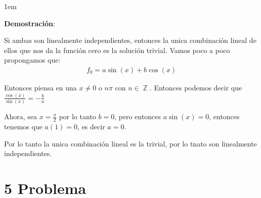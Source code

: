 \documentclass[12pt, fleqn]{article}                             %
\newenvironment{SmallIndentation}[1][0.75em]                    %
        {\begin{adjustwidth}{#1}{}\begin{footnotesize}}             %
        {\end{footnotesize}\end{adjustwidth}}                       %
\theoremstyle{break}                                            %
\DeclareMathOperator \Integers     {\mathbb{Z}}                 %
\newcommand{\Wrap}[1]    {\left( #1 \right)}                    %
\newcommand{\Cos}[1] {\cos\Wrap{#1}}                            %
\newcommand{\Sin}[1] {\sin\Wrap{#1}}                            %
\begin{document}
    \begin{SmallIndentation}[1em]
        \textbf{Demostración}:
        
        Si ambas son linealmente independientes, entonces la unica combinación lineal
        de ellos que nos da la función cero es la solución trivial. Vamos poco a poco
        propongamos que:
        \begin{align*}
            f_0 = a \Sin{x} + b \Cos{x}
        \end{align*}

        Entonces piensa en una $x \neq 0$ o $n\pi$ con $n \in \Integers$.
        Entonces podemos decir que $\frac{\Cos{x}}{\Sin{x}} = -\frac{b}{a}$

        Ahora, sea $x = \frac{\pi}{2}$ por lo tanto $b = 0$, pero entonces
        $a \Sin{x} = 0$, entonces tenemos que $a (1) = 0$, es decir $a = 0$.

        Por lo tanto la unica combinación lineal es la trivial, por lo tnato
        son linealmente independientes.
    
    \end{SmallIndentation}
        


\clearpage
\section{5 Problema}
\end{document}
